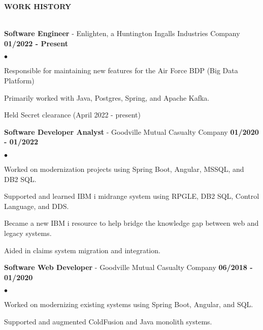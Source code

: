 \documentclass{article}
\newcommand{\lineunder}{
	\vspace*{-4pt}\\ 
	\hspace*{-18pt}\hrulefill \\
}
\newcommand{\header}[1]{
	{\hspace*{-15pt}\vspace*{6pt}\textsc{#1}}\vspace*{-6pt}\lineunder
}
\newcommand{\employer}[3]{
	\textbf{#1} - #2 \vspace*{2pt} \hfill \textbf{#3} \vspace*{2pt}
}
\newenvironment{resumelist}{
	\vspace*{2pt}
	\begin{list}
		{\small$\bullet$}{\topsep 0pt \itemsep -2pt}}{\vspace*{4pt}
	\end{list}
}
\newcommand{\resumeheader}[1]{
	\vspace*{14pt}
	\header{\textbf{#1}}
    \vspace*{5pt}
}
\begin{document}
	\resumeheader{WORK HISTORY}
		\employer
			{Software Engineer}{Enlighten, a Huntington Ingalls Industries Company}{01/2022 - Present}
			\begin{resumelist}
				\item Responsible for maintaining new features for the Air Force BDP (Big Data Platform)
				\item Primarily worked with Java, Postgres, Spring, and Apache Kafka.
				\item Held Secret clearance (April 2022 - present)
			\end{resumelist}
			\vspace*{6pt}
        \employer
			{Software Developer Analyst}{Goodville Mutual Casualty Company}{01/2020 - 01/2022}
			\begin{resumelist}
				\item Worked on modernization projects using Spring Boot, Angular, MSSQL, and DB2 SQL.
				\item Supported and learned IBM i midrange system using RPGLE, DB2 SQL, Control Language, and DDS.
				\item Became a new IBM i resource to help bridge the knowledge gap between web and legacy systems.
				\item Aided in claims system migration and integration.
			\end{resumelist}
            \vspace*{6pt}
		\employer
			{Software Web Developer}{Goodville Mutual Casualty Company}{06/2018 - 01/2020}
			\begin{resumelist}
				\item Worked on modernizing existing systems using Spring Boot, Angular, and SQL.
				\item Supported and augmented ColdFusion and Java monolith systems.
			\end{resumelist}
	
\end{document}
